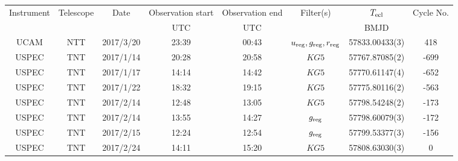 \begin{table}
	\begin{center}
		\begin{tabular}{cccccccc}
			\hline
			Instrument & Telescope & Date & Observation start & Observation end & Filter(s) & $T_{\rm ecl}$ & Cycle No. \\
			 &  &  & UTC & UTC &  & BMJD &  \\
			\hline
			\hline
			UCAM  & NTT     & 2017/3/20  & 23:39 & 00:43 & $u_{\rm reg},g_{\rm reg},r_{\rm reg}$ & 57833.00433(3)                                                                                                            &                                         418 \\
			USPEC & TNT     & 2017/1/14  & 20:28 & 20:58 & $KG5$                                 & 57767.87085(2)                                                                                                            &                                        -699 \\
			USPEC & TNT     & 2017/1/17  & 14:14 & 14:42 & $KG5$                                 & 57770.61147(4)                                                                                                            &                                        -652 \\
			USPEC & TNT     & 2017/1/22  & 18:32 & 19:15 & $KG5$                                 & 57775.80116(2)                                                                                                            &                                        -563 \\
			USPEC & TNT     & 2017/2/14  & 12:48 & 13:05 & $KG5$                                 & 57798.54248(2)                                                                                                            &                                        -173 \\
			USPEC & TNT     & 2017/2/14  & 13:55 & 14:27 & $g_{\rm reg}$                         & 57798.60079(3)                                                                                                            &                                        -172 \\
			USPEC & TNT     & 2017/2/15  & 12:24 & 12:54 & $g_{\rm reg}$                         & 57799.53377(3)                                                                                                            &                                        -156 \\
			USPEC & TNT     & 2017/2/24  & 14:11 & 15:20 & $KG5$                                 & 57808.63030(3)                                                                                                            &                                           0 \\

\end{tabular}
\end{center}
\end{table}
